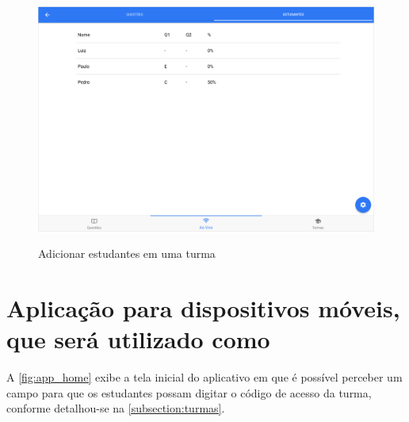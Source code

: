 \begin{figure}[h]
  \centering
  \caption{Adicionar estudantes em uma turma}
  \includegraphics[scale=.4]{imagens/telas/session_students_details}
  \doautor
  \label{fig:session_students_details}
\end{figure}

\clearpage

\section{Aplicação para dispositivos móveis, que será utilizado como {\clickers}}

A \autoref{fig:app_home} exibe a tela inicial do aplicativo em que é possível perceber
um campo para que os estudantes possam digitar o código de acesso da turma, conforme detalhou-se
na \autoref{subsection:turmas}.

